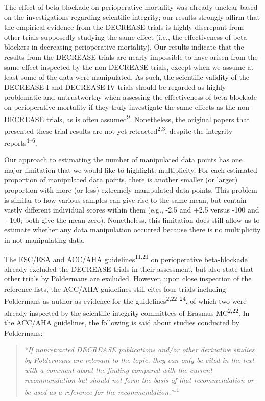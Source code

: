 \documentclass[]{article}
\begin{document}
The effect of beta-blockade on perioperative mortality was already
unclear based on the investigations regarding scientific integrity; our
results strongly affirm that the empirical evidence from the DECREASE
trials is highly discrepant from other trials supposedly studying the
same effect (i.e., the effectiveness of beta-blockers in decreasing
perioperative mortality). Our results indicate that the results from the
DECREASE trials are nearly impossible to have arisen from the same
effect inspected by the non-DECREASE trials, except when we assume at
least some of the data were manipulated. As such, the scientific
validity of the DECREASE-I and DECREASE-IV trials should be regarded as
highly problematic and untrustworthy when assessing the effectiveness of
beta-blockade on perioperative mortality if they truly investigate the
same effects as the non-DECREASE trials, as is often
assumed\textsuperscript{9}. Nonetheless, the original papers that
presented these trial results are not yet
retracted\textsuperscript{2,3}, despite the integrity
reports\textsuperscript{4--6}.

Our approach to estimating the number of manipulated data points has one
major limitation that we would like to highlight: multiplicity. For each
estimated proportion of manipulated data points, there is another
smaller (or larger) proportion with more (or less) extremely manipulated
data points. This problem is similar to how various samples can give
rise to the same mean, but contain vastly different individual scores
within them (e.g., -2.5 and +2.5 versus -100 and +100; both give the
mean zero). Nonetheless, this limitation does still allow us to estimate
whether any data manipulation occurred because there is no multiplicity
in not manipulating data.

The ESC/ESA and ACC/AHA guidelines\textsuperscript{11,21} on
perioperative beta-blockade already excluded the DECREASE trials in
their assessment, but also state that other trials by Poldermans are
excluded. However, upon close inspection of the reference lists, the
ACC/AHA guidelines still cites four trials including Poldermans as
author as evidence for the guidelines\textsuperscript{2,22--24}, of
which two were already inspected by the scientific integrity committees
of Erasmus MC\textsuperscript{2,22}. In the ACC/AHA guidelines, the
following is said about studies conducted by Poldermans:

\begin{quote}
\emph{``If nonretracted DECREASE publications and/or other derivative
studies by Poldermans are relevant to the topic, they can only be cited
in the text with a comment about the finding compared with the current
recommendation but should not form the basis of that recommendation or
be used as a reference for the recommendation.''}\textsuperscript{11}
\end{quote}
\end{document}
